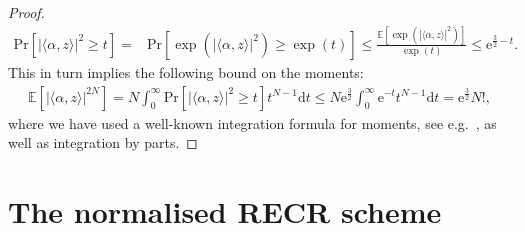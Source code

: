 \begin{proof}
\begin{align*}
  \mathrm{Pr} \left[ | \langle \alpha, z \rangle|^2 \geq t \right]
  =& \mathrm{Pr} \left[ \exp \left( | \langle  \alpha, z \rangle|^2 \right) \geq \exp \left( t \right) \right]
  \leq \frac{ \mathbb{E} \left[ \exp \left( | \langle \alpha,  z \rangle|^2 \right) \right]}{\exp (t)} \leq \mathrm{e}^{\frac{3}{2}-t}.
\end{align*}
This in turn implies the following bound on the moments:
\begin{align*}
  \mathbb{E} \left[ | \langle  \alpha, z \rangle|^{2N} \right]
  =  N \int_0^\infty \mathrm{Pr}\left[ | \langle  \alpha, z \rangle|^2\geq t \right] t^{N-1} \mathrm{d}t \leq N \mathrm{e}^{\frac{3}{2}} \int_0^\infty \mathrm{e}^{-t} t^{N-1} \mathrm{d}t
  = \mathrm{e}^{\frac{3}{2}} N!,
\end{align*}
where we have used a well-known integration formula for moments, see e.g.\ \cite[Prop.~7.1]{Foucart_2013_Mathematical}, as well as integration by parts.
\end{proof}


\section{The normalised RECR scheme}
\label{sec:pl.normalized_recr}


